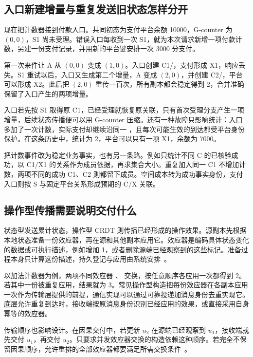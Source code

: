\subsection*{入口新建增量与重复发送旧状态怎样分开}

现在把计数器接到付款入口。共同初态为支付平台余额 10000，G-counter 为 $(0,0)$，S1 尚未受理。错误入口每收到一次 S1，就为本次请求新增一项付款计数，另建一份支付记录，并用新的平台键安排一次 3000 分支付。

第一次来件让 A 从 $(0,0)$ 变成 $(1,0)$。入口创建 C1/，支付形成 X1，响应丢失。S1 重试以后，入口又生成第二个增量，A 变成 $(2,0)$，并创建 C2/，平台可以形成 X2。此后把 $(2,0)$ 重传一百次，所有副本都会稳定得到 2，合并准确保留了入口产生的两项增量。

入口若先按 S1 取得原 C1，已经受理就恢复原关联，只有首次受理分支产生一项增量，后续状态传播便可以用 G-counter 压缩。还有一种故障只影响统计：入口多加了一次计数，实际支付却继续沿同一 ，且每次可能生效的到达都受平台身份保护。在这条历史中，统计为 2，平台可以只有一项 X1，余额为 7000。


把计数事件改为稳定业务事实，也有另一条路。例如只统计不同 C 的已核验成功，以 C1/X1 的关系作为成员依据，再求集合大小。重复加入同一 C1 不增加计数，两项不同的成功 C1、C2 则都留下成员。空间成本转为成功事实身份，支付入口则按 S 与固定平台关系形成预期的 C/X 关联。

\subsection*{操作型传播需要说明交付什么}

状态型发送累计状态，操作型 CRDT 则传播已经形成的操作效果。源副本先根据本地状态准备一份效应器，再在源和其他副本应用它。效应器是编码具体状态变化的数据或可执行描述，例如增加 1，或者删除源端已经观察到的这些标记。准备过程本身只计算这份描述，持久登记与应用由系统安排~\cite{preguica2018crdt}。

以加法计数器为例，两项不同效应器 、 交换，按任意顺序各应用一次都得到 2。若其中一份被重复应用，结果就为 3。常见操作型构造把每份效应器在各副本应用一次作为传输层提供的前提，通信实现可以通过可靠投递加消息身份去重实现它。底层允许重复到达时，接收端按原消息身份识别已经应用的效果，或直接采用自身幂等的效应器。

传输顺序也影响设计。在因果交付中，若更新 $u_2$ 在源端已经观察到 $u_1$，接收端就先交付 $u_1$，再交付 $u_2$。只要求并发效应器交换的构造依赖这种顺序。若完全不保留因果顺序，允许重排的全部效应器都要满足所需交换条件~\cite{preguica2018crdt}。

